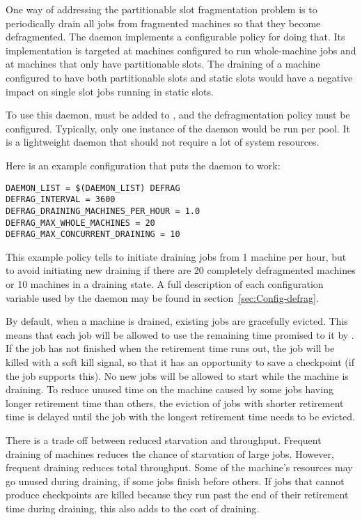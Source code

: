 One way of addressing the partitionable slot fragmentation problem is
to periodically drain all jobs from fragmented machines so that they
become defragmented.  
The  daemon implements a configurable policy for doing that.
Its implementation is targeted at machines configured to run whole-machine
jobs and at machines that only have partitionable slots.
The draining of a machine 
configured to have both partitionable slots and static slots 
would have a negative impact on single slot jobs running in static slots.

To use this daemon,
 must be added to ,
and the defragmentation policy must be configured.
Typically, only one instance of the  daemon would be
run per pool.  
It is a lightweight daemon that should not require a lot of system resources.

Here is an example configuration that puts the  daemon to work:

\begin{verbatim}
DAEMON_LIST = $(DAEMON_LIST) DEFRAG
DEFRAG_INTERVAL = 3600
DEFRAG_DRAINING_MACHINES_PER_HOUR = 1.0
DEFRAG_MAX_WHOLE_MACHINES = 20
DEFRAG_MAX_CONCURRENT_DRAINING = 10
\end{verbatim}

This example policy tells  to initiate draining 
jobs from 1 machine per hour,
but to avoid initiating new draining if there are 
20 completely defragmented machines or 10 machines in a draining state.
A full description of each configuration variable
used by the  daemon may be found in 
section~\ref{sec:Config-defrag}.

By default, when a machine is drained, existing jobs are gracefully evicted.
This means that each job will be allowed to use the remaining
time promised to it by .  
If the job has not finished when the retirement time runs out, 
the job will be killed with a soft kill signal, 
so that it has an opportunity to save a checkpoint
(if the job supports this).
No new jobs will be allowed to start while the machine is draining.
To reduce unused time on the
machine caused by some jobs having longer retirement time than others,
the eviction of jobs with shorter retirement time is delayed until the
job with the longest retirement time needs to be evicted.

There is a trade off between reduced starvation and throughput.
Frequent draining of machines reduces the chance of starvation of
large jobs.  However, frequent draining reduces total throughput.
Some of the machine's resources may go unused during draining,
if some jobs finish before others.  
If jobs that cannot produce checkpoints are killed
because they run past the end of their retirement time during draining,
this also adds to the cost of draining.

